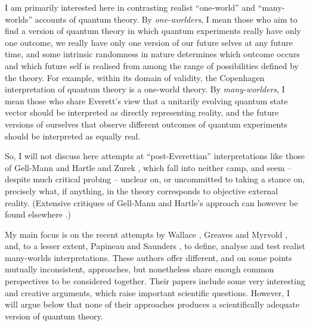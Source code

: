 \documentclass[aps,
pra,epsfig,12pt,nofootinbib]{revtex4}
\begin{document}
I am primarily interested here in contrasting realist ``one-world'' and
``many-worlds'' accounts of quantum theory.  By {\it one-worlders}, I mean
those who aim to find a version of quantum theory in which quantum
experiments really have only one outcome, we really have only one
version of our future selves at any future time, and some intrinsic
randomness in nature determines which outcome occurs and which future
self is realised from among the range of possibilities defined by the
theory.  For example, within its domain of validity, the Copenhagen
interpretation of quantum theory is a one-world theory.  By
{\it many-worlders}, I mean those who share Everett's view that a unitarily
evolving quantum state vector should be interpreted as directly
representing reality, and the future versions of ourselves that
observe different outcomes of quantum experiments should be
interpreted as equally real.

So, I will not discuss here attempts at ``post-Everettian''
interpretations like those of Gell-Mann and Hartle \cite{hartlevol} and
Zurek \cite{zurekvol}, which fall into neither camp, and 
seem -- despite much critical probing -- unclear on, or uncommitted to 
taking a stance on, precisely what, if
anything, in the theory corresponds to objective external reality.
(Extensive critiques of Gell-Mann and Hartle's approach
can however be found 
elsewhere \cite{dowkerkentone, dowkerkenttwo, 
kentone, kenttwo, kentthree, kentfour}.)

My main focus is on the recent attempts by 
Wallace \cite{wallacevolone, wallacevoltwo}, Greaves and 
Myrvold \cite{greavesmyrvoldvol}, and, to a lesser extent, 
Papineau \cite{papineauvol} and Saunders \cite{saundersvol}, 
to define, analyse and test realist many-worlds 
interpretations.  These authors offer
different, and on some points mutually inconsistent, approaches, but
nonetheless share enough common perspectives to be considered
together.  Their papers include some very interesting and creative
arguments, which raise important scientific questions.  However, I
will argue below that none of their approaches produces a
scientifically adequate version of quantum theory.
\end{document}
